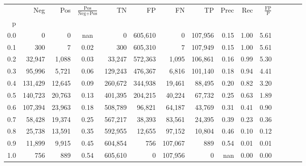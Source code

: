 \begin{tabular}{rrrcrrrrrrrrrrr}
\toprule
{} &      Neg &     Pos & $\frac{\text{Pos}}{\text{Neg}+\text{Pos}}$ &       TN &       FP &       FN &       TP &  Prec &   Rec & $\frac{\text{FP}}{\text{P}}$ \\
p   &          &         &                                            &          &          &          &          &       &       &                              \\
\midrule
0.0 &        0 &       0 &                                        nan &        0 &  605,610 &        0 &  107,956 &  0.15 &  1.00 &                         5.61 \\
0.1 &      300 &       7 &                                       0.02 &      300 &  605,310 &        7 &  107,949 &  0.15 &  1.00 &                         5.61 \\
0.2 &   32,947 &   1,088 &                                       0.03 &   33,247 &  572,363 &    1,095 &  106,861 &  0.16 &  0.99 &                         5.30 \\
0.3 &   95,996 &   5,721 &                                       0.06 &  129,243 &  476,367 &    6,816 &  101,140 &  0.18 &  0.94 &                         4.41 \\
0.4 &  131,429 &  12,645 &                                       0.09 &  260,672 &  344,938 &   19,461 &   88,495 &  0.20 &  0.82 &                         3.20 \\
0.5 &  140,723 &  20,763 &                                       0.13 &  401,395 &  204,215 &   40,224 &   67,732 &  0.25 &  0.63 &                         1.89 \\
0.6 &  107,394 &  23,963 &                                       0.18 &  508,789 &   96,821 &   64,187 &   43,769 &  0.31 &  0.41 &                         0.90 \\
0.7 &   58,428 &  19,374 &                                       0.25 &  567,217 &   38,393 &   83,561 &   24,395 &  0.39 &  0.23 &                         0.36 \\
0.8 &   25,738 &  13,591 &                                       0.35 &  592,955 &   12,655 &   97,152 &   10,804 &  0.46 &  0.10 &                         0.12 \\
0.9 &   11,899 &   9,915 &                                       0.45 &  604,854 &      756 &  107,067 &      889 &  0.54 &  0.01 &                         0.01 \\
1.0 &      756 &     889 &                                       0.54 &  605,610 &        0 &  107,956 &        0 &   nan &  0.00 &                         0.00 \\
\bottomrule
\end{tabular}
